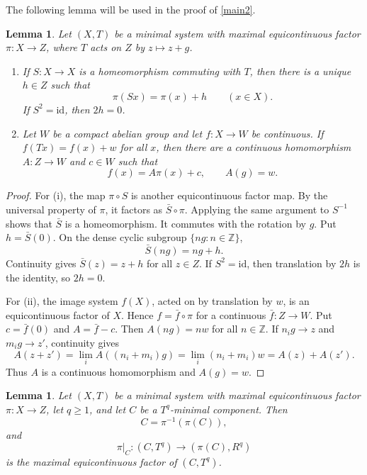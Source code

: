 \documentclass[reqno,12pt]{amsart}
\newtheorem{lemma}[thm]{Lemma}
\def \Z {\mathbb Z}
\numberwithin{equation}{section}
\begin{document}
The following lemma will be used in the proof of \cref{main2}.

\begin{lemma}\label{lem:mef-affine}
Let $(X,T)$ be a minimal system with maximal equicontinuous
factor $\pi:X\to Z$, where $T$ acts on $Z$ by $z\mapsto z+g$.
\begin{enumerate}
\renewcommand{\labelenumi}{\textup{(\roman{enumi})}}
\item If $S:X\to X$ is a homeomorphism commuting with $T$, then there is a
unique $h\in Z$ such that
\[
 \pi(Sx)=\pi(x)+h\qquad(x\in X).
\]
If $S^2=\mathrm{id}$, then $2h=0$.
\item Let $W$ be a compact abelian group and let $f:X\to W$ be continuous.
If $f(Tx)=f(x)+w$ for all $x$, then there are a continuous homomorphism
$A:Z\to W$ and $c\in W$ such that
\[
 f(x)=A\pi(x)+c,
 \qquad
 A(g)=w.
\]
\end{enumerate}
\end{lemma}

\begin{proof}
For (i), the map $\pi\circ S$ is another equicontinuous factor map. By the
universal property of $\pi$, it factors as $\bar S\circ\pi$. Applying the same
argument to $S^{-1}$ shows that $\bar S$ is a homeomorphism. It commutes with
the rotation by $g$. Put $h=\bar S(0)$. On the dense cyclic subgroup
$\{ng:n\in\Z\}$,
\[
 \bar S(ng)=ng+h.
\]
Continuity gives $\bar S(z)=z+h$ for all $z\in Z$. If $S^2=\mathrm{id}$,
then translation by $2h$ is the identity, so $2h=0$.

For (ii), the image system $f(X)$, acted on by translation by $w$, is an
equicontinuous factor of $X$. Hence $f=\bar f\circ\pi$ for a continuous
$\bar f:Z\to W$. Put $c=\bar f(0)$ and $A=\bar f-c$. Then
$A(ng)=nw$ for all $n\in\Z$. If $n_i g\to z$ and $m_i g\to z'$, continuity
gives
\[
 A(z+z')=\lim_i A((n_i+m_i)g)
 =\lim_i(n_i+m_i)w=A(z)+A(z').
\]
Thus $A$ is a continuous homomorphism and $A(g)=w$.
\end{proof}







\begin{lemma}%
\label{lem:power-mef}
Let $(X,T)$ be a minimal system with maximal equicontinuous
factor $\pi:X\to Z$, let $q\geq1$, and let $C$ be a
$T^q$-minimal component. Then
\[
 C=\pi^{-1}(\pi(C)),
\]
and
\[
 \pi|_C:(C,T^q)\longrightarrow(\pi(C),R^q)
\]
is the maximal equicontinuous factor of $(C,T^q)$.
\end{lemma}
\end{document}
